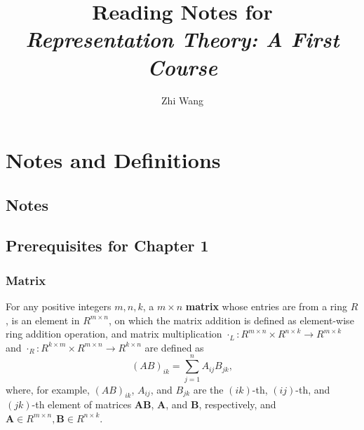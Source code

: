 \documentclass[12pt, letterpaper]{article}
\title{Reading Notes for \\ \large \textit{Representation Theory: A First Course}}
\author{Zhi Wang}
\theoremstyle{definition}
\theoremstyle{remark}
\theoremstyle{definition}
\theoremstyle{plain}
\numberwithin{equation}{section}
\begin{document}
	\cleardoublepage

	\maketitle
	
	
	
	\renewcommand\thepage{\romannumeral\numexpr\value{page}\relax}
	
	\tableofcontents
	
	
	\cleardoublepage

	
	\section{Notes and Definitions}
	\subsection{Notes}
	
	\subsection{Prerequisites for Chapter 1}
	
	\subsubsection{Matrix}
	
	\begin{def*}[matrix]
		For any positive integers $m, n, k$, a $m\times n$ \textbf{matrix} whose entries are from a ring $R$, is an element in $R^{m\times n}$, on which the matrix addition is defined as element-wise ring addition operation, and matrix multiplication
		$\cdot_L \colon R^{m\times n} \times R^{n\times k} \to R^{m\times k}$ and $\cdot_R \colon R^{k\times m} \times R^{m\times n} \to R^{k\times n}$ are defined as
		\[(AB)_{ik}=\sum_{j=1}^{n}A_{ij}B_{jk},\]
		where, for example, $(AB)_{ik}$, $A_{ij}$, and $B_{jk}$ are the $(ik)$-th, $(ij)$-th, and $(jk)$-th element of matrices $\mathbf{A}\mathbf{B}$, $\mathbf{A}$, and $\mathbf{B}$, respectively,
		and $\mathbf{A}\in R^{m\times n}, \mathbf{B} \in R^{n\times k}$.
	\end{def*}
	
\end{document}
